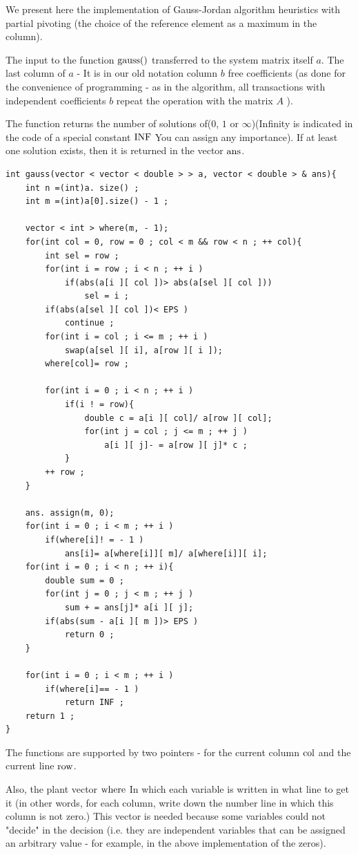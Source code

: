 We present here the implementation of Gauss-Jordan algorithm heuristics with partial pivoting (the choice of the reference element as a maximum in the column).

The input to the function $\rm gauss()$ transferred to the system matrix itself $a$. The last column of $a$ - It is in our old notation column $b$ free coefficients (as done for the convenience of programming - as in the algorithm, all transactions with independent coefficients $b$ repeat the operation with the matrix $A$ ).

The function returns the number of solutions of($0$, $1$ or $\infty$)(Infinity is indicated in the code of a special constant $\rm INF$ You can assign any importance). If at least one solution exists, then it is returned in the vector $\rm ans$.

\begin{verbatim}
int gauss(vector < vector < double > > a, vector < double > & ans){
    int n =(int)a. size() ;
    int m =(int)a[0].size() - 1 ;
 
    vector < int > where(m, - 1);
    for(int col = 0, row = 0 ; col < m && row < n ; ++ col){
        int sel = row ;
        for(int i = row ; i < n ; ++ i )
            if(abs(a[i ][ col ])> abs(a[sel ][ col ]))
                sel = i ;
        if(abs(a[sel ][ col ])< EPS )
            continue ;
        for(int i = col ; i <= m ; ++ i )
            swap(a[sel ][ i], a[row ][ i ]);
        where[col]= row ;
 
        for(int i = 0 ; i < n ; ++ i )
            if(i ! = row){
                double c = a[i ][ col]/ a[row ][ col];
                for(int j = col ; j <= m ; ++ j )
                    a[i ][ j]- = a[row ][ j]* c ;
            }
        ++ row ;
    }
 
    ans. assign(m, 0);
    for(int i = 0 ; i < m ; ++ i )
        if(where[i]! = - 1 )
            ans[i]= a[where[i]][ m]/ a[where[i]][ i];
    for(int i = 0 ; i < n ; ++ i){
        double sum = 0 ;
        for(int j = 0 ; j < m ; ++ j )
            sum + = ans[j]* a[i ][ j];
        if(abs(sum - a[i ][ m ])> EPS )
            return 0 ;
    }
 
    for(int i = 0 ; i < m ; ++ i )
        if(where[i]== - 1 )
            return INF ;
    return 1 ;
} 
\end{verbatim}
The functions are supported by two pointers - for the current column $\rm col$ and the current line $\rm row$.

Also, the plant vector $\rm where$ In which each variable is written in what line to get it (in other words, for each column, write down the number line in which this column is not zero.) This vector is needed because some variables could not "decide" in the decision (i.e. they are independent variables that can be assigned an arbitrary value - for example, in the above implementation of the zeros).

